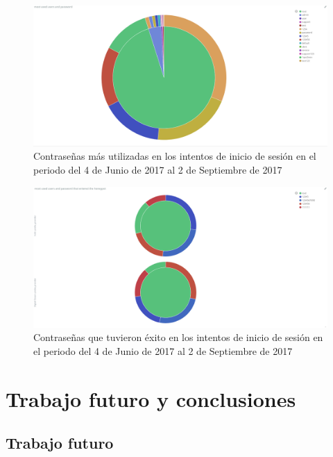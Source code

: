   \begin{figure}
    \centering
      \includegraphics[scale=0.3]{images/ElasticPiePasswors}
    \caption{Contraseñas más utilizadas en los intentos de inicio de sesión en el periodo del 4 de Junio de 2017 al 2 de Septiembre de 2017}
    \label{fig:data-pie-passwords}
  \end{figure}

  \begin{figure}
    \centering
      \includegraphics[scale=0.3]{images/ElasticPiePasswordSuccessful}
    \caption{Contraseñas que tuvieron éxito en los intentos de inicio de sesión en el periodo del 4 de Junio de 2017 al 2 de Septiembre de 2017}
    \label{fig:data-pie-passwords-successful}
  \end{figure}
  
  
  
\chapter{Trabajo futuro y conclusiones}
\section{Trabajo futuro}
\label{sec:trabajo-futuro}

